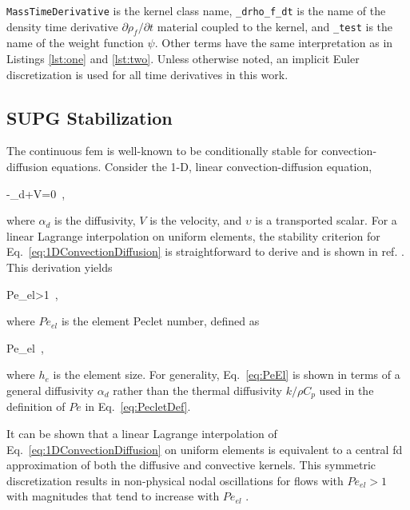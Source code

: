 \texttt{MassTimeDerivative} is the kernel class name, \texttt{\_drho\_f\_dt} is the name of the density time derivative \(\partial\rho_f/\partial t\) material coupled to the kernel, and \texttt{\_test} is the name of the weight function \(\psi\). Other terms have the same interpretation as in Listings \ref{lst:one} and \ref{lst:two}. Unless otherwise noted, an implicit Euler discretization is used for all time derivatives in this work.

\subsection[Streamline Upwind Petrov-Galerkin Stabilization]{SUPG Stabilization}
\label{sec:supg}

The continuous \gls{fem} is well-known to be conditionally stable for convection-diffusion equations. Consider the 1-D, linear convection-diffusion equation,

\beq
\label{eq:1DConvectionDiffusion}
-\alpha_d+V=0\ ,
\eeq

\noindent where \(\alpha_d\) is the diffusivity, \(V\) is the velocity, and \(\upsilon\) is a transported scalar. For a linear Lagrange interpolation on uniform elements, the stability criterion for Eq.\ \eqref{eq:1DConvectionDiffusion} is straightforward to derive and is shown in ref. \cite{novak_manual}. This derivation yields

\beq
\label{eq:PeCriterion}
Pe_{el}>1\ ,
\eeq

\noindent where \(Pe_{el}\) is the element Peclet number, defined as

\beq
\label{eq:PeEl}
Pe_{el}\equiv{}\ ,
\eeq

\noindent where \(h_e\) is the element size. For generality, Eq.\ \eqref{eq:PeEl} is shown in terms of a general diffusivity \(\alpha_d\) rather than the thermal diffusivity \(k/\rho C_p\) used in the definition of \(Pe\) in Eq.\ \eqref{eq:PecletDef}. 

It can be shown that a linear Lagrange interpolation of Eq.\ \eqref{eq:1DConvectionDiffusion} on uniform elements is equivalent to a central \gls{fd} approximation of both the diffusive and convective kernels. This symmetric discretization results in non-physical nodal oscillations for flows with \(Pe_{el}>1\) with magnitudes that tend to increase with \(Pe_{el}\) \cite{novak_manual,zienkiewicz}. 

